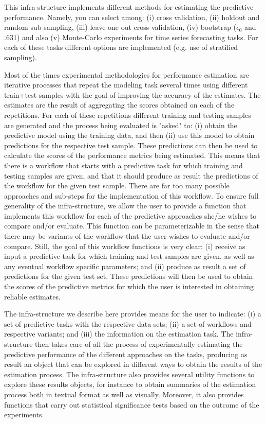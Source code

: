 \documentclass[10pt,a4paper]{article}\usepackage[]{graphicx}\usepackage[]{color}
\begin{document}
This infra-structure implements different methods for estimating the
predictive performance. Namely, you can select among: (i) cross
validation, (ii) holdout and random sub-sampling, (iii) leave one out
cross validation, (iv)  bootstrap ($\epsilon_0$ and .631) and also (v)
Monte-Carlo experiments for time series forecasting tasks. For each of
these tasks different options are implemented (e.g. use of stratified
sampling).

Most of the times experimental methodologies for performance estimation are iterative
processes that repeat the modeling task several times using different
train+test samples with the goal of improving the accuracy of the
estimates. The estimates are the result of aggregating the scores
obtained on each of the repetitions. For each of these
repetitions different training and testing samples are generated and
the process being evaluated is "asked" to: (i) obtain the predictive
model using the training data, and then (ii) use this model to obtain
predictions for the respective test sample. These predictions can then be
used to calculate the scores of the performance metrics being
estimated. This means that there is a workflow that starts with a
predictive task for which training and testing samples are given, and
that it should produce as result the predictions of the workflow for
the given test sample. There are far too many possible approaches and
sub-steps for the implementation of this workflow.  To ensure full
generality of the infra-structure, we allow the user to provide a
function that implements this workflow for each of the predictive
approaches she/he wishes to compare and/or evaluate. This function can
be parameterizable in the sense that there may be variants of the
workflow that the user wishes to evaluate and/or compare. Still, the
goal of this workflow  functions is very clear: (i)
receive as input a predictive task for which training  and  test
samples are given, as well as any eventual workflow specific parameters; and
(ii) produce as result a set of predictions for the given test
set.  These predictions
will then be used to obtain the scores of the predictive metrics for which the
user is interested in obtaining reliable estimates.

The infra-structure we describe here provides means for the user to
indicate: (i) a set of predictive tasks with the respective data sets;
(ii) a set of workflows and respective variants; and (iii) the
information on the estimation task. The infra-structure then takes care of all
the process of experimentally estimating the predictive performance of the different approaches on
the tasks, producing as result an object that can be
explored in different ways to obtain the results of the estimation process.
The infra-structure also provides several utility functions
to explore these results objects, for instance to
obtain summaries of the estimation process both in textual format as well as
visually. Moreover, it also provides functions that carry out
statistical significance tests based on the outcome of the
experiments. 
\end{document}
